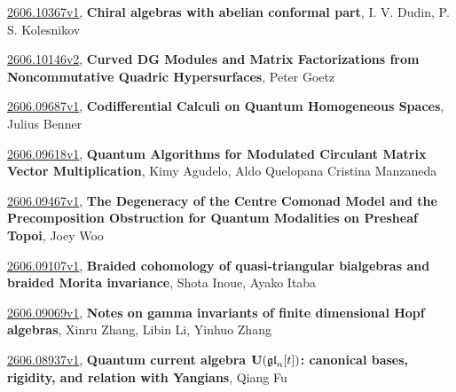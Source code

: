 \documentclass[9pt, a4paper]{article}
\theoremstyle{plain}
\theoremstyle{definition}
\theoremstyle{remark}
\newcommand{\arxiv}[3]{\href{https://arxiv.org/abs/#1}{#1}, \textbf{\textcolor{arxivblue}{#2}}, #3}
\begin{document}
\arxiv{2606.10367v1}{Chiral algebras with abelian conformal part}{I. V. Dudin, P. S. Kolesnikov}

\arxiv{2606.10146v2}{Curved DG Modules and Matrix Factorizations from Noncommutative Quadric Hypersurfaces}{Peter Goetz}

\arxiv{2606.09687v1}{Codifferential Calculi on Quantum Homogeneous Spaces}{Julius Benner}

\arxiv{2606.09618v1}{Quantum Algorithms for Modulated Circulant Matrix Vector Multiplication}{Kimy Agudelo, Aldo Quelopana Cristina Manzaneda}

\arxiv{2606.09467v1}{The Degeneracy of the Centre Comonad Model and the Precomposition Obstruction for Quantum Modalities on Presheaf Topoi}{Joey Woo}

\arxiv{2606.09107v1}{Braided cohomology of quasi-triangular bialgebras and braided Morita invariance}{Shota Inoue, Ayako Itaba}

\arxiv{2606.09069v1}{Notes on gamma invariants of finite dimensional Hopf algebras}{Xinru Zhang, Libin Li, Yinhuo Zhang}

\arxiv{2606.08937v1}{Quantum current algebra ${\bf U}(\frak{gl}_n[t])$: canonical bases, rigidity, and relation with Yangians}{Qiang Fu}

\end{document}
